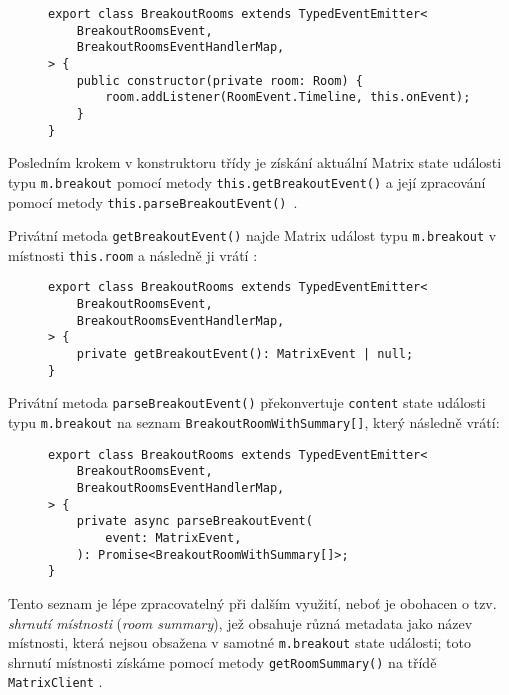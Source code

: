 \begin{figure}[H]
    \begin{verbatim}
export class BreakoutRooms extends TypedEventEmitter<
	BreakoutRoomsEvent,
	BreakoutRoomsEventHandlerMap,
> {
	public constructor(private room: Room) {
		room.addListener(RoomEvent.Timeline, this.onEvent);
	}
}
	\end{verbatim}
\end{figure}

Posledním krokem v konstruktoru třídy
je získání aktuální Matrix state události typu \texttt{m.breakout}
pomocí metody \texttt{this.getBreakoutEvent()} a její zpracování
pomocí metody
\texttt{this.parseBreakoutEvent()}~\parencite{GitHub-MatrixJSSDK-BreakoutRooms}.

Privátní metoda \texttt{getBreakoutEvent()} najde Matrix událost
typu \texttt{m.breakout} v místnosti
\texttt{this.room} a následně ji vrátí
\parencite{GitHub-MatrixJSSDK-BreakoutRooms}:

\begin{figure}[H]
    \begin{verbatim}
export class BreakoutRooms extends TypedEventEmitter<
	BreakoutRoomsEvent,
	BreakoutRoomsEventHandlerMap,
> {
	private getBreakoutEvent(): MatrixEvent | null;
}
	\end{verbatim}
\end{figure}

Privátní metoda \texttt{parseBreakoutEvent()} překonvertuje
\texttt{content} state události typu \texttt{m.breakout} na
seznam \texttt{BreakoutRoomWithSummary[]}, který následně vrátí:

\begin{figure}[H]
    \begin{verbatim}
export class BreakoutRooms extends TypedEventEmitter<
	BreakoutRoomsEvent,
	BreakoutRoomsEventHandlerMap,
> {
	private async parseBreakoutEvent(
		event: MatrixEvent,
	): Promise<BreakoutRoomWithSummary[]>;
}
	\end{verbatim}
\end{figure}

Tento seznam je lépe zpracovatelný při dalším využití, neboť je obohacen o tzv.
\textit{shrnutí místnosti} (\textit{room summary}), jež obsahuje různá metadata
jako název místnosti, která nejsou obsažena v samotné
\texttt{m.breakout} state události; toto shrnutí místnosti získáme
pomocí metody \texttt{getRoomSummary()} na třídě
\texttt{MatrixClient}
\parencite{GitHub-MatrixJSSDK-BreakoutRooms}.

